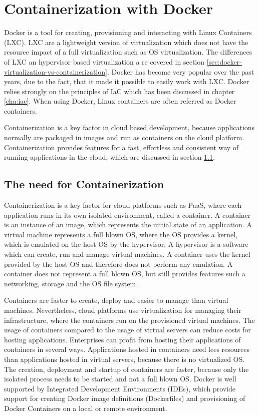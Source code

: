 \chapter{Containerization with Docker}
\label{cha:containerization-docker}
Docker \cite{Docker2018} is a tool for creating, provisioning and interacting with Linux Containers (LXC). LXC are a lightweight version of virtualization which does not have the resource impact of a full virtualization such as OS virtualization. The differences of LXC an hypervisor based virtualization a re covered in section \ref{sec:docker-virtualization-vs-containerization}. Docker has become very popular over the past years, due to the fact, that it made it possible to easily work with LXC. Docker relies strongly on the principles of IaC which has been discussed in chapter \ref{cha:iac}. When using Docker, Linux containers are often referred as Docker containers.

Containerization is a key factor in cloud based development, because applications normally are packaged in images and run as containers on the cloud platform. Containerization provides features for a fast, effortless and consistent way of running applications in the cloud, which are discussed in section \ref{sec:docker-need-for-containerization}.

\section{The need for Containerization}
\label{sec:docker-need-for-containerization}
Containerization is a key factor for cloud platforms such as PaaS, where each application runs in its own isolated environment, called a container. A container is an instance of an image, which represents the initial state of an application. A virtual machine represents a full blown OS, where the OS provides a kernel, which is emulated on the host OS by the hypervisor. A hypervisor is a software which can create, run and manage virtual machines. A container uses the kernel provided by the host OS and therefore does not perform any emulation. A container does not represent a full blown OS, but still provides features such a networking, storage and the OS file system.  

Containers are faster to create, deploy and easier to manage than virtual machines. Nevertheless, cloud platforms use virtualization for managing their infrastructure, where the containers run on the provisioned virtual machines. The usage of containers compared to the usage of virtual servers can reduce costs for hosting applications. Enterprises can profit from hosting their applications of containers in several ways. Applications hosted in containers need lees resources than applications hosted in virtual servers, because there is no virtualized OS. The creation, deployment and startup of containers are faster, because only the isolated process needs to be started and not a full blown OS. Docker is well supported by Integrated Development Environments (IDEs), which provide support for creating Docker image definitions (Dockerfiles) and provisioning of Docker Containers on a local or remote environment.

